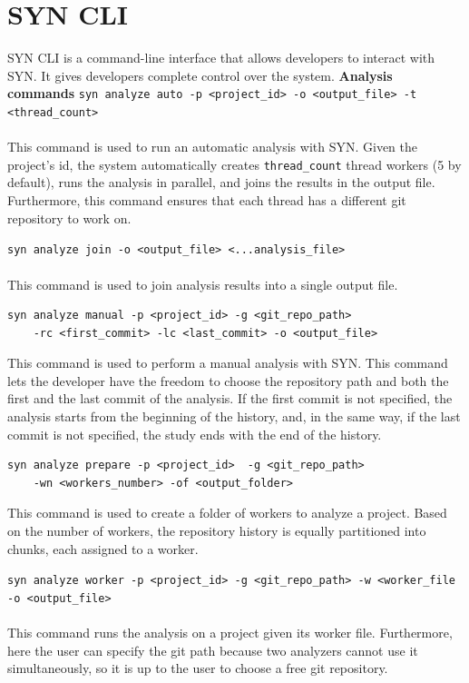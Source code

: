 \section{SYN CLI}
SYN CLI is a command-line interface that allows developers to interact with SYN. It gives developers complete control over the system.
\textbf{Analysis commands}
\lstinline{syn analyze auto -p <project_id> -o <output_file> -t <thread_count>}\\
\\
This command is used to run an automatic analysis with SYN. 
Given the project's id, the system automatically creates \texttt{thread\_count} thread workers (5 by default), runs the analysis in parallel, and joins the results in the output file. 
Furthermore, this command ensures that each thread has a different git repository to work on. 


\lstinline{syn analyze join -o <output_file> <...analysis_file>}\\
\\
This command is used to join analysis results into a single output file.

\begin{lstlisting}
syn analyze manual -p <project_id> -g <git_repo_path>
    -rc <first_commit> -lc <last_commit> -o <output_file>
\end{lstlisting}

This command is used to perform a manual analysis with SYN. This command lets the developer have the freedom to choose the repository path and both the first and the last commit of the analysis. 
If the first commit is not specified, the analysis starts from the beginning of the history, and, in the same way, if the last commit is not specified, the study ends with the end of the history. 


\begin{lstlisting}
syn analyze prepare -p <project_id>  -g <git_repo_path> 
    -wn <workers_number> -of <output_folder>
\end{lstlisting}

This command is used to create a folder of workers to analyze a project.
Based on the number of workers, the repository history is equally partitioned into chunks, each assigned to a worker. 


\lstinline{syn analyze worker -p <project_id> -g <git_repo_path> -w <worker_file -o <output_file>}\\
\\
This command runs the analysis on a project given its worker file. 
Furthermore, here the user can specify the git path because two analyzers cannot use it simultaneously, so it is up to the user to choose a free git repository. 


